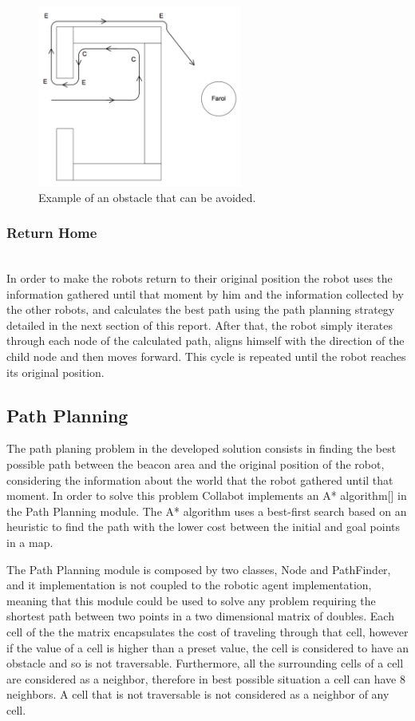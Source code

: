 \documentclass[oribibl]{llncs}
\begin{document}
\begin{figure}
  \centering
  \includegraphics[width=0.6\textwidth]{obstaculo1.png}
  \caption{Example of an obstacle that can be avoided.}
  \label{fig:obstacle1}
\end{figure}

\subsubsection{Return Home}\hfill \\

In order to make the robots return to their original position the robot uses the information gathered until that moment by him and the information collected by the other robots, and calculates the best path using the path planning strategy detailed in the next section of this report. After that, the robot simply iterates through each node of the calculated path, aligns himself with the direction of the child node and then moves forward. This cycle is repeated until the robot reaches its original position.

\subsection{Path Planning}
\label{sec:path-planning}
The path planing problem in the developed solution consists in finding the best possible path between the beacon area and the original position of the robot, considering the information about the world that the robot gathered until that moment. In order to solve this problem Collabot implements an A* algorithm[] in the Path Planning module. The A* algorithm uses a best-first search based on an heuristic to find the path with the lower cost between the initial and goal points in a map.

The Path Planning module is composed by two classes, Node and PathFinder, and it implementation is not coupled to the robotic agent implementation, meaning that this module could be used to solve any problem requiring the shortest path between two points in a two dimensional matrix of doubles. Each cell of the the matrix encapsulates the cost of traveling through that cell, however if the value of a cell is higher than a preset value, the cell is considered to have an obstacle and so is not traversable. Furthermore, all the surrounding cells of a cell are considered as a neighbor, therefore in best possible situation a cell can have 8 neighbors. A cell that is not traversable is not considered as a neighbor of any cell.
\end{document}
